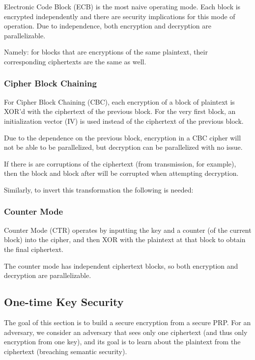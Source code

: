 \documentclass{article}
\begin{document}
\begin{multicols}{2}
Electronic Code Block (ECB) is the most naive operating mode. Each block is encrypted independently and there are security implications for this mode of operation. Due to independence, both encryption and decryption are parallelizable.

Namely: for blocks that are encryptions of the same plaintext, their corresponding ciphertexts are the same as well.

\subsubsection{Cipher Block Chaining}

For Cipher Block Chaining (CBC), each encryption of a block of plaintext is XOR'd with the ciphertext of the previous block. For the very first block, an initialization vector (IV) is used instead of the ciphertext of the previous block.

Due to the dependence on the previous block, encryption in a CBC cipher will not be able to be parallelized, but decryption can be parallelized with no issue.

If there is are corruptions of the ciphertext (from transmission, for example), then the block and block after will be corrupted when attempting decryption.

Similarly, to invert this transformation the following is needed:

\subsubsection{Counter Mode}

Counter Mode (CTR) operates by inputting the key and a counter (of the current block) into the cipher, and then XOR with the plaintext at that block to obtain the final ciphertext.

The counter mode has independent ciphertext blocks, so both encryption and decryption are parallelizable.

\subsection{One-time Key Security}

The goal of this section is to build a secure encryption from a secure PRP. For an adversary, we consider an adversary that sees only one ciphertext (and thus only encryption from one key), and its goal is to learn about the plaintext from the ciphertext (breaching semantic security).


\end{multicols}
\end{document}
